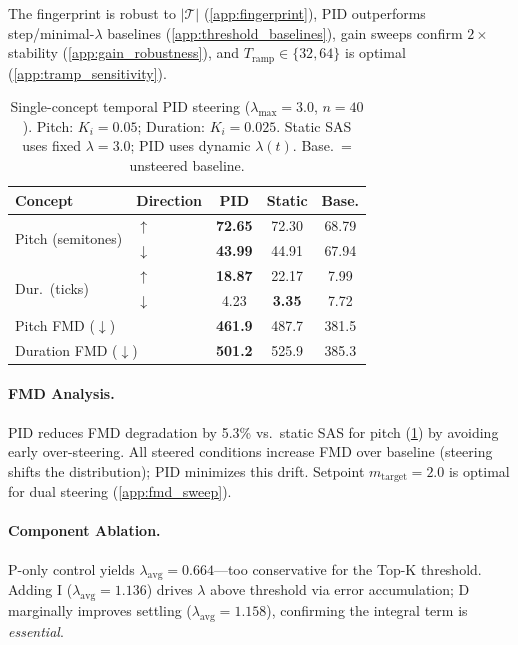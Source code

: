 \documentclass{article}
\theoremstyle{plain}
\begin{document}
The fingerprint is robust to $|\mathcal{T}|$ (\cref{app:fingerprint}), PID outperforms step/minimal-$\lambda$ baselines (\cref{app:threshold_baselines}), gain sweeps confirm $2{\times}$ stability (\cref{app:gain_robustness}), and $T_\text{ramp} \in \{32,64\}$ is optimal (\cref{app:tramp_sensitivity}).

\begin{table}[t]
  \caption{Single-concept temporal PID steering ($\lambda_\text{max}{=}3.0$, $n{=}40$). Pitch: $K_i{=}0.05$; Duration: $K_i{=}0.025$. Static SAS uses fixed $\lambda{=}3.0$; PID uses dynamic $\lambda(t)$. Base.\ = unsteered baseline.}
  \label{tab:single}
  \begin{center}
  \begin{small}
  \begin{tabular}{llccc}
    \toprule
    Concept & Direction & PID & Static & Base. \\
    \midrule
    \multirow{2}{*}{Pitch (semitones)} & $\uparrow$ & \textbf{72.65} & 72.30 & 68.79 \\
    & $\downarrow$ & \textbf{43.99} & 44.91 & 67.94 \\
    \multirow{2}{*}{Dur.\ (ticks)} & $\uparrow$ & \textbf{18.87} & 22.17 & 7.99 \\
    & $\downarrow$ & 4.23 & \textbf{3.35} & 7.72 \\
    \midrule
    \multicolumn{2}{l}{Pitch FMD ($\downarrow$)} & \textbf{461.9} & 487.7 & 381.5 \\
    \multicolumn{2}{l}{Duration FMD ($\downarrow$)} & \textbf{501.2} & 525.9 & 385.3 \\
    \bottomrule
  \end{tabular}
  \end{small}
  \end{center}
  \vskip -0.1in
\end{table}

\paragraph{FMD Analysis.}
PID reduces FMD degradation by 5.3\% vs.\ static SAS for pitch (\cref{tab:single}) by avoiding early over-steering. All steered conditions increase FMD over baseline (steering shifts the distribution); PID minimizes this drift. Setpoint $m_\text{target}{=}2.0$ is optimal for dual steering (\cref{app:fmd_sweep}).

\paragraph{Component Ablation.}
\label{sec:ablation}
P-only control yields $\lambda_\text{avg}{=}0.664$---too conservative for the Top-K threshold. Adding I ($\lambda_\text{avg}{=}1.136$) drives $\lambda$ above threshold via error accumulation; D marginally improves settling ($\lambda_\text{avg}{=}1.158$), confirming the integral term is \emph{essential}.
\end{document}
